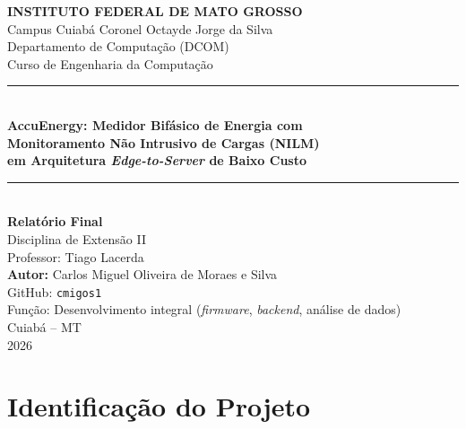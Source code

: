 \documentclass[12pt,a4paper]{article}
\begin{document}
\begin{titlepage}
\centering
\vspace*{1cm}

{\Large\bfseries INSTITUTO FEDERAL DE MATO GROSSO}\\[0.2cm]
{\large Campus Cuiab\'a Coronel Octayde Jorge da Silva}\\[0.1cm]
{\normalsize Departamento de Computa\c{c}\~ao (DCOM)}\\[0.1cm]
{\normalsize Curso de Engenharia da Computa\c{c}\~ao}\\[2.5cm]

\rule{\linewidth}{0.4pt}\\[0.6cm]
{\LARGE\bfseries AccuEnergy: Medidor Bif\'asico de Energia com\\[0.2cm]
Monitoramento N\~ao Intrusivo de Cargas (NILM)\\[0.2cm]
em Arquitetura \textit{Edge-to-Server} de Baixo Custo}\\[0.6cm]
\rule{\linewidth}{0.4pt}\\[2.5cm]

{\large\bfseries Relat\'orio Final}\\[0.3cm]
{\normalsize Disciplina de Extens\~ao II}\\[0.1cm]
{\normalsize Professor: Tiago Lacerda}\\[3cm]

{\large \textbf{Autor:} Carlos Miguel Oliveira de Moraes e Silva}\\[0.2cm]
{\normalsize GitHub: \texttt{cmigos1}}\\[0.1cm]
{\normalsize Fun\c{c}\~ao: Desenvolvimento integral (\textit{firmware}, \textit{backend}, an\'alise de dados)}\\

\vfill
{\normalsize Cuiab\'a -- MT\\ 2026}
\end{titlepage}

\tableofcontents
\newpage

\section{Identifica\c{c}\~ao do Projeto}
\end{document}
